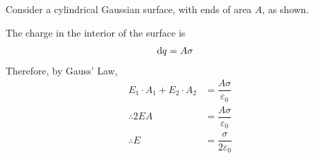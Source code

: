 \documentclass[fleqn, a4paper, 12pt, twoside]{article}
\theoremstyle{definition}
\theoremstyle{theorem}
\begin{document}
\begin{solution}
	Consider a cylindrical Gaussian surface, with ends of area $A$, as shown.
	\begin{figure}[H]
	\end{figure}
	The charge in the interior of the surface is
	\begin{align*}
		\dif q &= A \sigma
	\end{align*}
	Therefore, by Gauss' Law,
	\begin{align*}
		E_1 \cdot A_1 + E_2 \cdot A_2 &= \dfrac{A \sigma}{\varepsilon_0}\\
		\therefore 2 E A &= \dfrac{A \sigma}{\varepsilon_0}\\
		\therefore E &= \dfrac{\sigma}{2 \varepsilon_0}
	\end{align*}
\end{solution}
\end{document}
